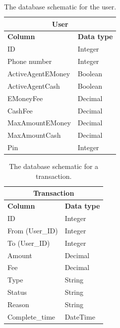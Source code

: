 \documentclass[11pt, a4paper]{article}
\begin{document}
\begin{table}[ht]
\centering
\begin{tabular}{ll}
\hline
\multicolumn{2}{|c|}{\textbf{User}}                           \\ \hline
\multicolumn{1}{|l|}{\textbf{Column}}          & \multicolumn{1}{l|}{\textbf{Data type}} \\ \hline
\multicolumn{1}{|l|}{ID}        & \multicolumn{1}{l|}{Integer} \\ \hline
\multicolumn{1}{|l|}{Phone number}    & \multicolumn{1}{l|}{Integer} \\ \hline
\multicolumn{1}{|l|}{ActiveAgentEMoney} & \multicolumn{1}{l|}{Boolean} \\ \hline
\multicolumn{1}{|l|}{ActiveAgentCash}   & \multicolumn{1}{l|}{Boolean} \\ \hline
\multicolumn{1}{|l|}{EMoneyFee}     & \multicolumn{1}{l|}{Decimal} \\ \hline
\multicolumn{1}{|l|}{CashFee}       & \multicolumn{1}{l|}{Decimal} \\ \hline
\multicolumn{1}{|l|}{MaxAmountEMoney}   & \multicolumn{1}{l|}{Decimal} \\ \hline
\multicolumn{1}{|l|}{MaxAmountCash}   & \multicolumn{1}{l|}{Decimal} \\ \hline
\multicolumn{1}{|l|}{Pin}         & \multicolumn{1}{l|}{Integer} \\ \hline
\end{tabular}
\caption{The database schematic for the user.}
\label{tab: user}
\end{table}

\begin{table}[ht]
\centering
\begin{tabular}{ll}
\hline
\multicolumn{2}{|c|}{\textbf{Transaction}}                           \\ \hline
\multicolumn{1}{|l|}{\textbf{Column}}& \multicolumn{1}{l|}{\textbf{Data type}} \\ \hline
\multicolumn{1}{|l|}{ID}       & \multicolumn{1}{l|}{Integer} \\ \hline
\multicolumn{1}{|l|}{From (User\_ID)} & \multicolumn{1}{l|}{Integer} \\ \hline
\multicolumn{1}{|l|}{To (User\_ID)}   & \multicolumn{1}{l|}{Integer} \\ \hline
\multicolumn{1}{|l|}{Amount}     & \multicolumn{1}{l|}{Decimal} \\ \hline
\multicolumn{1}{|l|}{Fee}      & \multicolumn{1}{l|}{Decimal} \\ \hline
\multicolumn{1}{|l|}{Type}       & \multicolumn{1}{l|}{String} \\ \hline
\multicolumn{1}{|l|}{Status}     & \multicolumn{1}{l|}{String} \\ \hline
\multicolumn{1}{|l|}{Reason}     & \multicolumn{1}{l|}{String} \\ \hline
\multicolumn{1}{|l|}{Complete\_time}  & \multicolumn{1}{l|}{DateTime} \\ \hline
\end{tabular}
\caption{The database schematic for a transaction.}
\label{tab: transaction}
\end{table}
\end{document}
